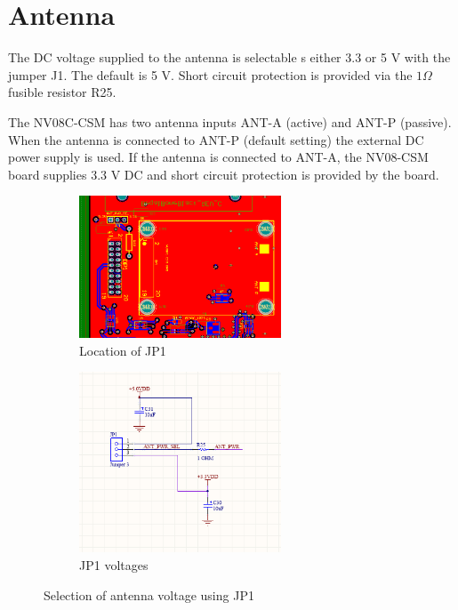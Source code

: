 
\section{Antenna} \label{sAntenna}

The DC voltage supplied to the antenna is selectable s either 3.3 or 5 V with the jumper J1. 
The default is 5 V. Short circuit protection is 
provided via the $1 \Omega$ fusible resistor R25.

The NV08C-CSM has two antenna inputs ANT-A (active) and ANT-P (passive).
When the antenna is connected to ANT-P (default setting) the external DC power supply is used.
If the antenna is connected to ANT-A, the NV08-CSM board supplies 3.3 V DC and
short circuit protection is provided by the board.


\begin{figure}

	\centering
	
	\begin{subfigure}[t]{6cm}
		\includegraphics[width=6cm]{figures/antennavselpcb.png}
		\caption{Location of JP1 }
	\end{subfigure}
	
	\quad

	\begin{subfigure}[t]{6cm}
		\includegraphics[width=6cm]{figures/antennavselcircuit.png}
		\caption{JP1 voltages}
	\end{subfigure}
	
	\caption{Selection of antenna voltage using JP1}
	
\end{figure}
